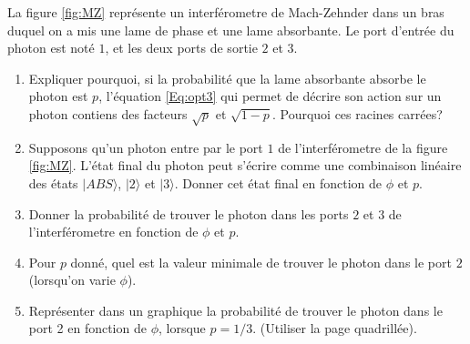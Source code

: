 La figure \ref{fig:MZ} représente un interférometre de Mach-Zehnder dans un bras duquel on a mis une lame de phase et une lame absorbante.  Le port d'entrée du photon est noté $1$, et les deux ports de sortie $2$ et $3$.

\begin{enumerate}
\item Expliquer pourquoi, si la probabilité que la lame absorbante absorbe le photon est $p$, l'équation \eqref{Eq:opt3} qui permet de décrire son action sur un photon contiens des facteurs $\sqrt{p}$ et $\sqrt{1-p}$. Pourquoi ces racines carrées?

\item 
Supposons qu'un photon entre par le port $1$ de l'interférometre de la figure \ref{fig:MZ}. L'état final du photon peut s'écrire comme une combinaison linéaire des états $ \vert ABS \rangle $, $ \vert 2 \rangle $ et $ \vert 3 \rangle $. Donner cet état final en fonction de $\phi$ et $p$.

\item Donner la probabilité de trouver le photon dans les ports $2$ et $3$ de l'interférometre en  fonction de $\phi$ et $p$.

\item Pour $p$ donné, quel est la valeur minimale de trouver le photon dans le port $2$ (lorsqu'on varie $\phi$).

\item Représenter dans un graphique la probabilité de trouver le photon dans le port 2 en fonction de $\phi$, lorsque $p=1/3$. (Utiliser la page quadrillée).


\end{enumerate}

\newpage
\ 



\newpage\ 
\newpage

\begin{center}
\end{center}